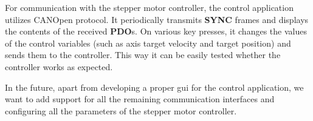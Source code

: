 For communication with the stepper motor controller, the control application utilizes CANOpen protocol.
It periodically transmits \textbf{SYNC} frames and displays the contents of the received \textbf{PDO}s.
On various key presses, it changes the values of the control variables (such as axis target velocity and target position) and sends them to the controller.
This way it can be easily tested whether the controller works as expected.

In the future, apart from developing a proper \acs{gui} for the control application, we want to add support for all the remaining communication interfaces and configuring all the parameters of the stepper motor controller.
